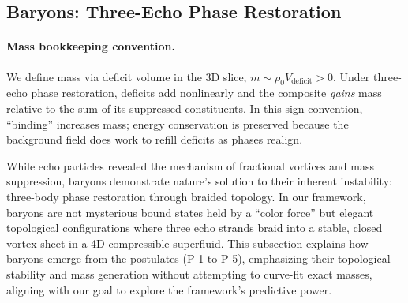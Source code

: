 
\subsection{Baryons: Three-Echo Phase Restoration}
\label{sec:baryons}
 \paragraph{Mass bookkeeping convention.} We define mass via deficit volume in the 3D slice, $m\sim \rho_0 V_{\text{deficit}}>0$. Under three-echo phase restoration, deficits add nonlinearly and the composite \emph{gains} mass relative to the sum of its suppressed constituents. In this sign convention, ``binding'' increases mass; energy conservation is preserved because the background field does work to refill deficits as phases realign.

While echo particles revealed the mechanism of fractional vortices and mass suppression, baryons demonstrate nature's solution to their inherent instability: three-body phase restoration through braided topology. In our framework, baryons are not mysterious bound states held by a ``color force'' but elegant topological configurations where three echo strands braid into a stable, closed vortex sheet in a 4D compressible superfluid. This subsection explains how baryons emerge from the postulates (P-1 to P-5), emphasizing their topological stability and mass generation without attempting to curve-fit exact masses, aligning with our goal to explore the framework's predictive power.

